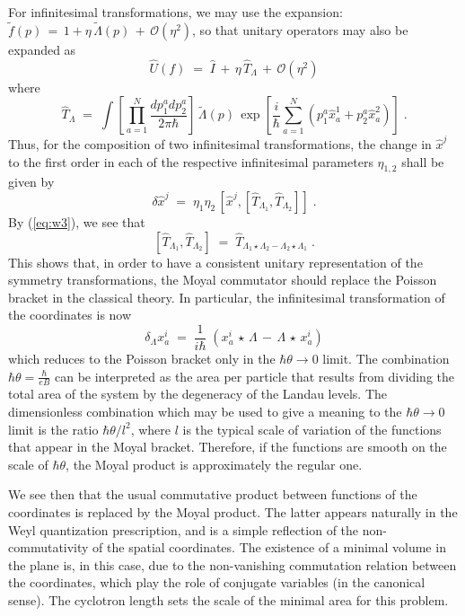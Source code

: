 \documentclass[a4paper,12pt]{article}
\begin{document}
For infinitesimal transformations, we may use the expansion:
${\tilde
  f}(p)\,=\, 1 + \eta \, {\tilde \Lambda}(p)\, +\, {\mathcal
O}(\eta^2)$, so that
unitary operators may also be expanded as
\begin{equation}
  \label{eq:opexp}
{\hat U}(f)\;=\; {\hat I} \,+\, \eta \, {\hat T}_\Lambda \,+\,
{\mathcal O}(\eta^2)
\end{equation}
where
\begin{equation}
{\hat T}_\Lambda \;=\; \int [\prod_{a=1}^N \frac{dp_1^a
dp_2^a}{2\pi \hbar}]\,
{\tilde \Lambda}(p) \, 
\exp [ \frac{i}{\hbar} \sum_{a=1}^N (p_1^a {\hat x}^1_a +p_2^a
{\hat x}^2_a) ]
\;.
\end{equation}
Thus, for the composition of two infinitesimal transformations, the
change in ${\hat x}^j$ to the first order in each of the respective
infinitesimal parameters $\eta_{1,2}$ shall be given by
\begin{equation}
  \label{eq:compo}
\delta {\hat x}^j \;=\; \eta_1 \eta_2 \, 
[{\hat x}^j , [{\hat T}_{\Lambda_1} , {\hat T}_{\Lambda_2}]] \;.
\end{equation}
By (\ref{eq:w3}), we see that
\begin{equation}
   \label{eq:comm}
 [{\hat T}_{\Lambda_1} , {\hat T}_{\Lambda_2}] \;=\; {\hat
T}_{\Lambda_1 \star \Lambda_2
- \Lambda_2 \star \Lambda_1} \;.
\end{equation}
This shows that, in order to have a consistent unitary
representation
of the symmetry transformations, the Moyal commutator should
replace
the Poisson bracket in the classical theory. In particular, the
infinitesimal transformation of the coordinates is now
\begin{equation}
  \label{eq:nctrns}
\delta_\Lambda x^i_a \;=\;\frac{1}{i \hbar}\; \left( x^i_a \, \star
\, \Lambda \,-\, \Lambda \,\star\, x^i_a \right)
\end{equation}
which reduces to the Poisson bracket only in the $\hbar \theta \to
0$ limit.  The
combination $\hbar \theta=\frac{\hbar}{e B}$ can be interpreted as
the area per
particle that results from dividing the total area of the system by
the degeneracy of the Landau levels. The dimensionless combination
which may be used to give a meaning to the $\hbar \theta \to 0$
limit is the
ratio $\hbar \theta/l^2$, where $l$ is the typical scale of
variation of the
functions that appear in the Moyal bracket.  Therefore, if the
functions are smooth on the scale of $\hbar \theta$, the Moyal
product is
approximately the regular one.

We see then that the usual commutative product between functions of
the coordinates is replaced by the Moyal product. The latter
appears
naturally in the Weyl quantization prescription, and is a simple
reflection of the non-commutativity of the spatial coordinates.
The
existence of a minimal volume in the plane is, in this case, due to
the non-vanishing commutation relation between the coordinates,
which
play the role of conjugate variables (in the canonical sense).  The
cyclotron length sets the scale of the minimal area for this
problem.
\end{document}

